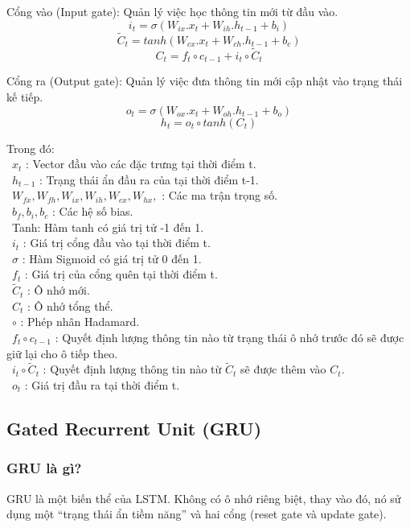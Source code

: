 \documentclass[conference]{IEEEtran}
\begin{document}
Cổng vào (Input gate): Quản lý việc học thông tin mới từ đầu vào.
\[i_t=\sigma(W_{ix}.x_t+W_{ih}.h_{t-1}+b_i)\]
\[{\widetilde{C}}_t=tanh\left(W_{cx}.x_t+W_{ch}.h_{t-1}+b_c\right)\]
\[C_t=f_t\circ c_{t-1}+i_t\circ{\widetilde{C}}_t\]

Cổng ra (Output gate): Quản lý việc đưa thông tin mới cập nhật vào trạng thái kế tiếp.
\[o_t=\sigma(W_{ox}.x_t+W_{oh}.h_{t-1}+b_o)\]
\[h_t=o_t\circ tanh(C_t)\]

Trong đó:\\
\indent\textbullet\ \(x_t\) : Vector đầu vào các đặc trưng tại thời điểm t.\\
\indent\textbullet\ \(h_{t-1}\) : Trạng thái ẩn đầu ra của tại thời điểm t-1.\\
\indent\textbullet\ \(W_{fx},W_{fh},W_{ix},W_{ih},W_{cx},W_{hx},\) : Các ma trận trọng số.\\
\indent\textbullet\ \(b_f,b_i, b_c \) : Các hệ số bias.\\
\indent\textbullet\ Tanh: Hàm tanh có giá trị tử -1 đến 1.\\
\indent\textbullet\ \(i_t\) : Giá trị cổng đầu vào tại thời điểm t.\\
\indent\textbullet\ \(\sigma\) : Hàm Sigmoid có giá trị tử 0 đến 1.\\
\indent\textbullet\ \(f_t\) : Giá trị của cổng quên tại thời điểm t.\\
\indent\textbullet\ \(\widetilde{C}_t \) : Ô nhớ mới.\\
\indent\textbullet\ \(C_t \) : Ô nhớ tổng thể.\\
\indent\textbullet\ \(\circ\) : Phép nhân Hadamard.\\
\indent\textbullet\ \(f_t\circ c_{t-1}\) : Quyết định lượng thông tin nào từ trạng thái ô nhớ trước đó sẽ được giữ lại cho ô tiếp theo.\\
\indent\textbullet\ \(i_t\circ{\widetilde{C}}_t\) : Quyết định lượng thông tin nào từ \({\widetilde{C}}_t\) sẽ được thêm vào \(C_t\).\\
\indent\textbullet\ \(o_t \) : Giá trị đầu ra tại thời điểm t.


\subsection{Gated Recurrent Unit (GRU)}
\subsubsection{GRU là gì?}
GRU là một biến thể của LSTM. Không có ô nhớ riêng biệt, thay vào đó, nó sử dụng một “trạng thái ẩn tiềm năng” và hai cổng (reset gate và update gate).
\end{document}
